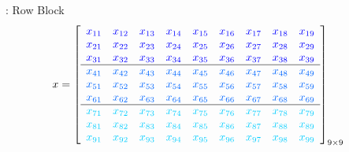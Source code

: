 \begin{frame}
  \begin{exampleblock}{:  Row Block}
    \begin{align*}
      x &= \left[
          \begin{array}{lllllllll}
            \color{g11}x_{11} & \color{g11}x_{12} & \color{g11}x_{13} &
\color{g11}x_{14} & \color{g11}x_{15} & \color{g11}x_{16} & \color{g11}x_{17} &
\color{g11}x_{18} & \color{g11}x_{19}\\
      \color{g11}x_{21} & \color{g11}x_{22} & \color{g11}x_{23} &
\color{g11}x_{24} & \color{g11}x_{25} & \color{g11}x_{26} & \color{g11}x_{27} &
\color{g11}x_{28} & \color{g11}x_{29}\\
      \color{g11}x_{31} & \color{g11}x_{32} & \color{g11}x_{33} &
\color{g11}x_{34} & \color{g11}x_{35} & \color{g11}x_{36} & \color{g11}x_{37} &
\color{g11}x_{38} & \color{g11}x_{39}\\\hline
      \color{g12}x_{41} & \color{g12}x_{42} & \color{g12}x_{43} &
\color{g12}x_{44} & \color{g12}x_{45} & \color{g12}x_{46} & \color{g12}x_{47} &
\color{g12}x_{48} & \color{g12}x_{49}\\
      \color{g12}x_{51} & \color{g12}x_{52} & \color{g12}x_{53} &
\color{g12}x_{54} & \color{g12}x_{55} & \color{g12}x_{56} & \color{g12}x_{57} &
\color{g12}x_{58} & \color{g12}x_{59}\\
      \color{g12}x_{61} & \color{g12}x_{62} & \color{g12}x_{63} &
\color{g12}x_{64} & \color{g12}x_{65} & \color{g12}x_{66} & \color{g12}x_{67} &
\color{g12}x_{68} & \color{g12}x_{69}\\\hline
      \color{g13}x_{71} & \color{g13}x_{72} & \color{g13}x_{73} &
\color{g13}x_{74} & \color{g13}x_{75} & \color{g13}x_{76} & \color{g13}x_{77} &
\color{g13}x_{78} & \color{g13}x_{79}\\
      \color{g13}x_{81} & \color{g13}x_{82} & \color{g13}x_{83} &
\color{g13}x_{84} & \color{g13}x_{85} & \color{g13}x_{86} & \color{g13}x_{87} &
\color{g13}x_{88} & \color{g13}x_{89}\\
      \color{g13}x_{91} & \color{g13}x_{92} & \color{g13}x_{93} &
\color{g13}x_{94} & \color{g13}x_{95} & \color{g13}x_{96} & \color{g13}x_{97} &
\color{g13}x_{98} & \color{g13}x_{99}\\
          \end{array}
      \right]_{9\times 9}
    \end{align*}
    \vspace{-.6cm}
    \begin{align*}

\end{align*}
\end{exampleblock}
\end{frame}
